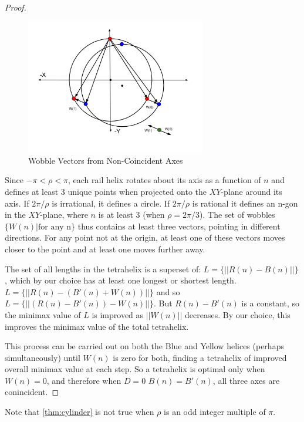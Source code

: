 \documentclass[review]{siamonline1116}
\begin{document}
\begin{proof}
  \begin{figure}[H]
     \centering
     \includegraphics[width=0.7\textwidth]{figures/WobbleDiagram.png}
     \caption{Wobble Vectors from Non-Coincident Axes}
  \label{fig:wobble}
\end{figure}
  
  Since $-\pi<\rho<\pi$, each rail helix rotates about its axis as a function of $n$ and
  defines at least 3 unique points when projected onto the $XY$-plane around its axis.
  If $2\pi/\rho$ is irrational, it defines a circle. If $2\pi/\rho$ is rational it defines
  an n-gon in the $XY$-plane, where $n$ is at least 3 (when $\rho = 2\pi/3$).
  The set of wobbles $\{W(n) | \text{for any n}\}$ thus contains at least three vectors,
  pointing in different directions.
  For any point not at the origin, at least one of these vectors moves closer to the
  point and at least one moves further away.

    The set of all lengths in the tetrahelix is a superset of:
    $L = \{|| R(n) - B(n)||\}$, which by our choice has at least one longest or shortest
    length.
    $L = \{|| R(n) - (B'(n) + W(n))||\}$ and so
    $L = \{|| (R(n) - B'(n)) - W(n)||\}$.
    But $R(n) - B'(n)$ is a constant, so the minimax value of $L$ is improved as $||W(n)||$
    decreases.  
    By our choice, this improves the minimax value of the total tetrahelix.
    
    This process can be carried out on both the Blue and Yellow helices
    (perhaps simultaneously) until $W(n)$ is
    zero for both, finding a tetrahelix of improved overall minimax value at each step.
    So a tetrahelix is optimal only when $W(n) = 0$, and therefore when $D=0$
    $B(n) = B'(n)$, all three axes are conincident.
  \end{proof}


Note that \cref{thm:cylinder} is not true when $\rho$ is an odd integer multiple of $\pi$.
\end{document}
